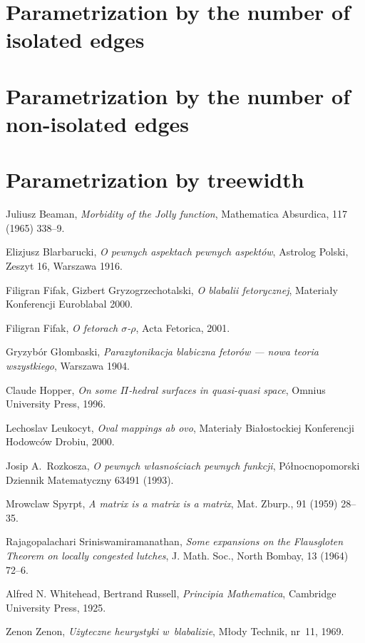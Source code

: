 \documentclass[en]{pracamgr}
\begin{document}
\section{Parametrization by the number of isolated edges}



\section{Parametrization by the number of non-isolated edges}

\section{Parametrization by treewidth}

\begin{thebibliography}{99}

 Juliusz Beaman, \textit{Morbidity of the Jolly
    function}, Mathematica Absurdica, 117 (1965) 338--9.

 Elizjusz Blarbarucki, \textit{O pewnych
    aspektach pewnych aspektów}, Astrolog Polski, Zeszyt 16, Warszawa
  1916.

 Filigran Fifak, Gizbert Gryzogrzechotalski,
  \textit{O blabalii fetorycznej}, Materiały Konferencji Euroblabal
  2000.

 Filigran Fifak, \textit{O fetorach
    $\sigma$-$\rho$}, Acta Fetorica, 2001.

 Gryzybór Głombaski, \textit{Parazytonikacja
    blabiczna fetorów --- nowa teoria wszystkiego}, Warszawa 1904.

 Claude Hopper, \textit{On some $\Pi$-hedral
    surfaces in quasi-quasi space}, Omnius University Press, 1996.

 Lechoslav Leukocyt, \textit{Oval mappings ab ovo},
  Materiały Białostockiej Konferencji Hodowców Drobiu, 2000.

 Josip A.~Rozkosza, \textit{O pewnych własnościach
    pewnych funkcji}, Północnopomorski Dziennik Matematyczny 63491
  (1993).

 Mrowclaw Spyrpt, \textit{A matrix is a matrix
    is a matrix}, Mat. Zburp., 91 (1959) 28--35.

 Rajagopalachari Sriniswamiramanathan,
  \textit{Some expansions on the Flausgloten Theorem on locally
    congested lutches}, J. Math.  Soc., North Bombay, 13 (1964) 72--6.

 Alfred N. Whitehead, Bertrand Russell,
  \textit{Principia Mathematica}, Cambridge University Press, 1925.

 Zenon Zenon, \textit{Użyteczne heurystyki
    w~blabalizie}, Młody Technik, nr~11, 1969.

\end{thebibliography}
\end{document}
